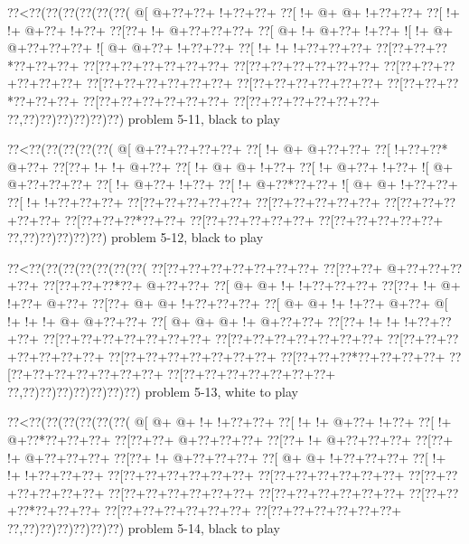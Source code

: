 \vbox{\vbox{\goo
\0??<\0??(\0??(\0??(\0??(\0??(\0??(
\- @[\- @+\0??+\0??+\- !+\0??+\0??+
\0??[\- !+\- @+\- @+\- !+\0??+\0??+
\0??[\- !+\- !+\- @+\0??+\- !+\0??+
\0??[\0??+\- !+\- @+\0??+\0??+\0??+
\0??[\- @+\- !+\- @+\0??+\- !+\0??+
\- ![\- !+\- @+\- @+\0??+\0??+\0??+
\- ![\- @+\- @+\0??+\- !+\0??+\0??+
\0??[\- !+\- !+\- !+\0??+\0??+\0??+
\0??[\0??+\0??+\0??*\0??+\0??+\0??+
\0??[\0??+\0??+\0??+\0??+\0??+\0??+
\0??[\0??+\0??+\0??+\0??+\0??+\0??+
\0??[\0??+\0??+\0??+\0??+\0??+\0??+
\0??[\0??+\0??+\0??+\0??+\0??+\0??+
\0??[\0??+\0??+\0??+\0??+\0??+\0??+
\0??[\0??+\0??+\0??*\0??+\0??+\0??+
\0??[\0??+\0??+\0??+\0??+\0??+\0??+
\0??[\0??+\0??+\0??+\0??+\0??+\0??+
\0??,\0??)\0??)\0??)\0??)\0??)\0??)
}
\hfil problem 5-11, black to play\hfil\break
}

\vbox{\vbox{\goo
\0??<\0??(\0??(\0??(\0??(\0??(
\- @[\- @+\0??+\0??+\0??+\0??+
\0??[\- !+\- @+\- @+\0??+\0??+
\0??[\- !+\0??+\0??*\- @+\0??+
\0??[\0??+\- !+\- !+\- @+\0??+
\0??[\- !+\- @+\- @+\- !+\0??+
\0??[\- !+\- @+\0??+\- !+\0??+
\- ![\- @+\- @+\0??+\0??+\0??+
\0??[\- !+\- @+\0??+\- !+\0??+
\0??[\- !+\- @+\0??*\0??+\0??+
\- ![\- @+\- @+\- !+\0??+\0??+
\0??[\- !+\- !+\0??+\0??+\0??+
\0??[\0??+\0??+\0??+\0??+\0??+
\0??[\0??+\0??+\0??+\0??+\0??+
\0??[\0??+\0??+\0??+\0??+\0??+
\0??[\0??+\0??+\0??*\0??+\0??+
\0??[\0??+\0??+\0??+\0??+\0??+
\0??[\0??+\0??+\0??+\0??+\0??+
\0??,\0??)\0??)\0??)\0??)\0??)
}
\hfil problem 5-12, black to play\hfil\break
}

\vbox{\vbox{\goo
\0??<\0??(\0??(\0??(\0??(\0??(\0??(\0??(
\0??[\0??+\0??+\0??+\0??+\0??+\0??+\0??+
\0??[\0??+\0??+\- @+\0??+\0??+\0??+\0??+
\0??[\0??+\0??+\0??*\0??+\- @+\0??+\0??+
\0??[\- @+\- @+\- !+\- !+\0??+\0??+\0??+
\0??[\0??+\- !+\- @+\- !+\0??+\- @+\0??+
\0??[\0??+\- @+\- @+\- !+\0??+\0??+\0??+
\0??[\- @+\- @+\- !+\- !+\0??+\- @+\0??+
\- @[\- !+\- !+\- !+\- @+\- @+\0??+\0??+
\0??[\- @+\- @+\- @+\- !+\- @+\0??+\0??+
\0??[\0??+\- !+\- !+\- !+\0??+\0??+\0??+
\0??[\0??+\0??+\0??+\0??+\0??+\0??+\0??+
\0??[\0??+\0??+\0??+\0??+\0??+\0??+\0??+
\0??[\0??+\0??+\0??+\0??+\0??+\0??+\0??+
\0??[\0??+\0??+\0??+\0??+\0??+\0??+\0??+
\0??[\0??+\0??+\0??*\0??+\0??+\0??+\0??+
\0??[\0??+\0??+\0??+\0??+\0??+\0??+\0??+
\0??[\0??+\0??+\0??+\0??+\0??+\0??+\0??+
\0??,\0??)\0??)\0??)\0??)\0??)\0??)\0??)
}
\hfil problem 5-13, white to play\hfil\break
}

\vbox{\vbox{\goo
\0??<\0??(\0??(\0??(\0??(\0??(\0??(
\- @[\- @+\- @+\- !+\- !+\0??+\0??+
\0??[\- !+\- !+\- @+\0??+\- !+\0??+
\0??[\- !+\- @+\0??*\0??+\0??+\0??+
\0??[\0??+\0??+\- @+\0??+\0??+\0??+
\0??[\0??+\- !+\- @+\0??+\0??+\0??+
\0??[\0??+\- !+\- @+\0??+\0??+\0??+
\0??[\0??+\- !+\- @+\0??+\0??+\0??+
\0??[\- @+\- @+\- !+\0??+\0??+\0??+
\0??[\- !+\- !+\- !+\0??+\0??+\0??+
\0??[\0??+\0??+\0??+\0??+\0??+\0??+
\0??[\0??+\0??+\0??+\0??+\0??+\0??+
\0??[\0??+\0??+\0??+\0??+\0??+\0??+
\0??[\0??+\0??+\0??+\0??+\0??+\0??+
\0??[\0??+\0??+\0??+\0??+\0??+\0??+
\0??[\0??+\0??+\0??*\0??+\0??+\0??+
\0??[\0??+\0??+\0??+\0??+\0??+\0??+
\0??[\0??+\0??+\0??+\0??+\0??+\0??+
\0??,\0??)\0??)\0??)\0??)\0??)\0??)
}
\hfil problem 5-14, black to play\hfil\break
}

